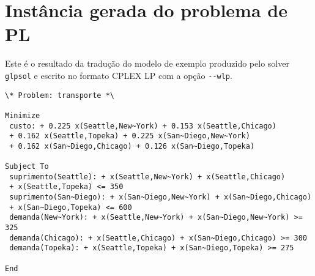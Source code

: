 \documentclass[11pt, brazil]{report}
\begin{document}
%
%
%
%
%
%
%
%
%
%
%
%
%
%
%
%
%
%
%
%
%

\newpage

\section{Instância gerada do problema de PL}

Este é o resultado da tradução do modelo de exemplo produzido
pelo solver \verb|glpsol| e escrito no formato CPLEX LP
com a opção \verb|--wlp|.

\medskip

\begin{verbatim}
\* Problem: transporte *\

Minimize
 custo: + 0.225 x(Seattle,New~York) + 0.153 x(Seattle,Chicago)
 + 0.162 x(Seattle,Topeka) + 0.225 x(San~Diego,New~York)
 + 0.162 x(San~Diego,Chicago) + 0.126 x(San~Diego,Topeka)

Subject To
 suprimento(Seattle): + x(Seattle,New~York) + x(Seattle,Chicago)
 + x(Seattle,Topeka) <= 350
 suprimento(San~Diego): + x(San~Diego,New~York) + x(San~Diego,Chicago)
 + x(San~Diego,Topeka) <= 600
 demanda(New~York): + x(Seattle,New~York) + x(San~Diego,New~York) >= 325
 demanda(Chicago): + x(Seattle,Chicago) + x(San~Diego,Chicago) >= 300
 demanda(Topeka): + x(Seattle,Topeka) + x(San~Diego,Topeka) >= 275

End
\end{verbatim}
\end{document}
